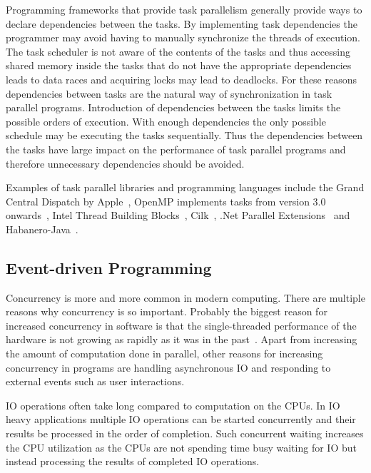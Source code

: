 Programming frameworks that provide task parallelism generally provide ways to declare dependencies between the tasks. By implementing task dependencies the programmer may avoid having to manually synchronize the threads of execution. The task scheduler is not aware of the contents of the tasks and thus accessing shared memory inside the tasks that do not have the appropriate dependencies leads to data races and acquiring locks may lead to deadlocks. For these reasons dependencies between tasks are the natural way of synchronization in task parallel programs. Introduction of dependencies between the tasks limits the possible orders of execution. With enough dependencies the only possible schedule may be executing the tasks sequentially. Thus the dependencies between the tasks have large impact on the performance of task parallel programs and therefore unnecessary dependencies should be avoided.~\cite{hennessy2011computer}

Examples of task parallel libraries and programming languages include the Grand Central Dispatch by Apple~\cite{sakamoto2012grand}, OpenMP implements tasks from version 3.0 onwards~\cite{ayguade2009design}, Intel Thread Building Blocks~\cite{pheatt2008intel}, Cilk~\cite{blumofe1996cilk}, .Net Parallel Extensions~\cite{leijen2009design} and Habanero-Java~\cite{barik2009habanero}.

\subsection{Event-driven Programming}
\label{subsec:event-driven-programming}
Concurrency is more and more common in modern computing. There are multiple reasons why concurrency is so important. Probably the biggest reason for increased concurrency in software is that the single-threaded performance of the hardware is not growing as rapidly as it was in the past~\cite{sutter2005free}. Apart from increasing the amount of computation done in parallel, other reasons for increasing concurrency in programs are handling asynchronous IO and responding to external events such as user interactions.

IO operations often take long compared to computation on the CPUs. In IO heavy applications multiple IO operations can be started concurrently and their results be processed in the order of completion. Such concurrent waiting increases the CPU utilization as the CPUs are not spending time busy waiting for IO but instead processing the results of completed IO operations.~\cite{dabek2002event}

